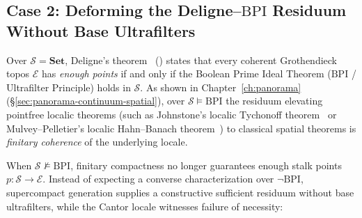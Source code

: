 \subsection{Case 2: Deforming the Deligne--$\mathrm{BPI}$ Residuum Without Base Ultrafilters}

Over $\mathcal{S} = \mathbf{Set}$, Deligne's theorem~\cite[Exp.~VI, Appendice]{Deligne72} (\cite[\S D3.3, Thm.~D3.3.13]{Johnstone02}) states that every coherent Grothendieck topos $\mathcal{E}$ has \emph{enough points} if and only if the Boolean Prime Ideal Theorem ($\mathrm{BPI}$ / Ultrafilter Principle) holds in $\mathcal{S}$. As shown in Chapter~\ref{ch:panorama} (\S\ref{sec:panorama-continuum-spatial}), over $\mathcal{S} \models \mathrm{BPI}$ the residuum elevating pointfree localic theorems (such as Johnstone's localic Tychonoff theorem~\cite{Johnstone81} or Mulvey--Pelletier's localic Hahn--Banach theorem~\cite{MulveyPelletier91}) to classical spatial theorems is \emph{finitary coherence} of the underlying locale.

When $\mathcal{S} \not\models \mathrm{BPI}$, finitary compactness no longer guarantees enough stalk points $p: \mathcal{S} \to \mathcal{E}$. Instead of expecting a converse characterization over $\neg\mathrm{BPI}$, supercompact generation supplies a constructive sufficient residuum without base ultrafilters, while the Cantor locale witnesses failure of necessity:

